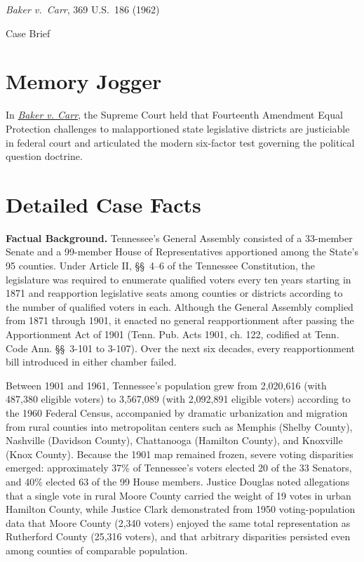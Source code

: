\documentclass[12pt]{article}
\begin{document}
\begin{center}
{\LARGE \textit{Baker v.\ Carr}, 369 U.S.\ 186 (1962)\par}
\vspace{0.8em}
{\large Case Brief\par}
\end{center}
\vspace{1em}

\section{Memory Jogger}

In \href{https://supreme.justia.com/cases/federal/us/369/186/}{\textit{Baker v. Carr}}, the Supreme Court held that Fourteenth Amendment Equal Protection challenges to malapportioned state legislative districts are justiciable in federal court and articulated the modern six-factor test governing the political question doctrine.

\section{Detailed Case Facts}

\textbf{Factual Background.} Tennessee's General Assembly consisted of a 33-member Senate and a 99-member House of Representatives apportioned among the State's 95 counties. Under Article II, \S\S~4--6 of the Tennessee Constitution, the legislature was required to enumerate qualified voters every ten years starting in 1871 and reapportion legislative seats among counties or districts according to the number of qualified voters in each. Although the General Assembly complied from 1871 through 1901, it enacted no general reapportionment after passing the Apportionment Act of 1901 (Tenn. Pub. Acts 1901, ch. 122, codified at Tenn. Code Ann. \S\S~3-101 to 3-107). Over the next six decades, every reapportionment bill introduced in either chamber failed.

Between 1901 and 1961, Tennessee's population grew from 2,020,616 (with 487,380 eligible voters) to 3,567,089 (with 2,092,891 eligible voters) according to the 1960 Federal Census, accompanied by dramatic urbanization and migration from rural counties into metropolitan centers such as Memphis (Shelby County), Nashville (Davidson County), Chattanooga (Hamilton County), and Knoxville (Knox County). Because the 1901 map remained frozen, severe voting disparities emerged: approximately 37\% of Tennessee's voters elected 20 of the 33 Senators, and 40\% elected 63 of the 99 House members. Justice Douglas noted allegations that a single vote in rural Moore County carried the weight of 19 votes in urban Hamilton County, while Justice Clark demonstrated from 1950 voting-population data that Moore County (2,340 voters) enjoyed the same total representation as Rutherford County (25,316 voters), and that arbitrary disparities persisted even among counties of comparable population.
\end{document}
